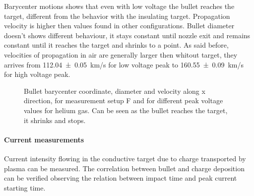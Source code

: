Barycenter motions shows that even with low voltage the bullet reaches the target, different from the behavior with the insulating target. Propagation velocity is higher then values found in other configurations.
Bullet diameter doesn't shows different behaviour, it stays constant until nozzle exit and remains constant until it reaches the target and shrinks to a point. As said before, velocities of propagation in air are generally larger then whitout target, they arrives from \SI{112.04(5)}{\kilo\meter/\second} for low voltage peak to \SI{160.55(9)}{\kilo\meter/\second} for high voltage peak.
\begin{figure}
 \centering
 \hfill
 \caption{Bullet barycenter coordinate, diameter and velocity along x direction, for measurement setup F and for different peak voltage values for helium gas. Can be seen as the bullet reaches the target, it shrinks and stops.}
 \label{fig:elio_a_xb}
\end{figure}

\paragraph{Current measurements}
Current intensity flowing in the conductive target due to charge transported by plasma can be measured. The correlation between bullet and charge deposition can be verified observing the relation between impact time and peak current starting time.

